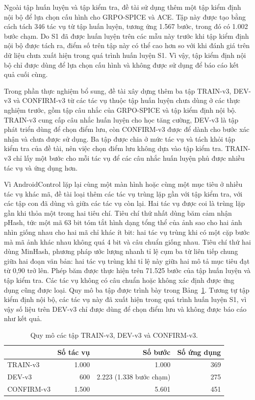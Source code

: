 Ngoài tập huấn luyện và tập kiểm tra, đề tài sử dụng thêm một tập kiểm định nội bộ để lựa chọn cấu hình cho GRPO-SPICE và ACE. Tập này được tạo bằng cách tách 346 tác vụ từ tập huấn luyện, tương ứng 1.567 bước, trong đó có 1.002 bước chạm. Do S1 đã được huấn luyện trên các mẫu này trước khi tập kiểm định nội bộ được tách ra, điểm số trên tập này có thể cao hơn so với khi đánh giá trên dữ liệu chưa xuất hiện trong quá trình huấn luyện S1. Vì vậy, tập kiểm định nội bộ chỉ được dùng để lựa chọn cấu hình và không được sử dụng để báo cáo kết quả cuối cùng.

Trong phần thực nghiệm bổ sung, đề tài xây dựng thêm ba tập TRAIN-v3, DEV-v3 và CONFIRM-v3 từ các tác vụ thuộc tập huấn luyện chưa dùng ở các thực nghiệm trước, gồm tập câu nhắc của GRPO-SPICE và tập kiểm định nội bộ. TRAIN-v3 cung cấp câu nhắc huấn luyện cho học tăng cường, DEV-v3 là tập phát triển dùng để chọn điểm lưu, còn CONFIRM-v3 được để dành cho bước xác nhận và chưa được sử dụng. Ba tập được chia ở mức tác vụ và tách khỏi tập kiểm tra của đề tài, nên việc chọn điểm lưu không dựa vào tập kiểm tra. TRAIN-v3 chỉ lấy một bước cho mỗi tác vụ để các câu nhắc huấn luyện phủ được nhiều tác vụ và ứng dụng hơn.

Vì AndroidControl lặp lại cùng một màn hình hoặc cùng một mục tiêu ở nhiều tác vụ khác mã, đề tài loại thêm các tác vụ trùng lặp gần với tập kiểm tra, với các tập con đã dùng và giữa các tác vụ còn lại. Hai tác vụ được coi là trùng lặp gần khi thỏa một trong hai tiêu chí. Tiêu chí thứ nhất dùng băm cảm nhận pHash, tức một mã 63 bit tóm tắt hình dạng tổng thể của ảnh sao cho hai ảnh nhìn giống nhau cho hai mã chỉ khác ít bit: hai tác vụ trùng khi có một cặp bước mà mã ảnh khác nhau không quá 4 bit và câu chuẩn giống nhau. Tiêu chí thứ hai dùng MinHash, phương pháp ước lượng nhanh tỉ lệ cụm ba từ liên tiếp chung giữa hai đoạn văn bản: hai tác vụ trùng khi tỉ lệ này giữa hai mô tả mục tiêu đạt từ 0,90 trở lên. Phép băm được thực hiện trên 71.525 bước của tập huấn luyện và tập kiểm tra. Các tác vụ không có câu chuẩn hoặc không xác định được ứng dụng cũng được loại. Quy mô ba tập được trình bày trong Bảng~\ref{tab:3.v3}. Tương tự tập kiểm định nội bộ, các tác vụ này đã xuất hiện trong quá trình huấn luyện S1, vì vậy số liệu trên DEV-v3 chỉ được dùng để chọn điểm lưu và không được báo cáo như kết quả.

\begin{table}[htbp]
\centering\small
\caption{Quy mô các tập TRAIN-v3, DEV-v3 và CONFIRM-v3.}\label{tab:3.v3}
\begin{tabular}{@{}lrrr@{}}
\toprule
 & \textbf{Số tác vụ} & \textbf{Số bước} & \textbf{Số ứng dụng} \\
\midrule
TRAIN-v3 & 1.000 & 1.000 & 369 \\
DEV-v3 & 600 & 2.223 (1.338 bước chạm) & 275 \\
CONFIRM-v3 & 1.500 & 5.601 & 451 \\
\bottomrule
\end{tabular}
\end{table}


